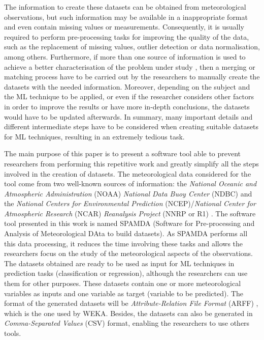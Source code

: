 \documentclass[energies,article,submit,moreauthors,pdftex]{Definitions/mdpi}
\begin{document}
		The information to create these datasets can be obtained from meteorological observations, but such information may be available in a inappropriate format and even contain missing values or measurements. Consequently, it is usually required to perform pre-processing tasks for improving the quality of the data, such as the replacement of missing values, outlier detection or data normalisation, among others. Furthermore, if more than one source of information is used to achieve a better characterisation of the problem under study \cite{FERNANDEZ201544, Adams2010}, then a merging or matching process have to be carried out by the researchers to manually create the datasets with the needed information. Moreover, depending on the subject and the ML technique to be applied, or even if the researcher considers other factors in order to improve the results or have more in-depth conclusions, the datasets would have to be updated afterwards. In summary, many important details and different intermediate steps have to be considered when creating suitable datasets for ML techniques, resulting in an extremely tedious task.

		The main purpose of this paper is to present a software tool able to prevent researchers from performing this repetitive work and greatly simplify all the steps involved in the creation of datasets. The meteorological data considered for the tool come from two well-known sources of information: the \textit{National Oceanic and Atmospheric Administration} (NOAA) \textit{National Data Buoy Center} (NDBC) \cite{NOAA} and the \textit{National Centers for Environmental Prediction} (NCEP)/\textit{National Center for Atmospheric Research} (NCAR) \textit{Reanalysis Project} (NNRP or R1) \cite{Kalnay1996, Kistler2001}. The software tool presented in this work is named SPAMDA (Software for Pre-processing and Analysis of Meteorological DAta to build datasets). As SPAMDA performs all this data processing, it reduces the time involving these tasks and allows the researchers focus on the study of the meteorological aspects of the observations. The datasets obtained are ready to be used as input for ML techniques in prediction tasks (classification or regression), although the researchers can use them for other purposes. These datasets contain one or more meteorological variables as inputs and one variable as target (variable to be predicted). The format of the generated datasets will be \textit{Attribute-Relation File Format} (ARFF) \cite{WEKA_ARFF}, which is the one used by WEKA. Besides, the datasets can also be generated in \textit{Comma-Separated Values} (CSV) format, enabling the researchers to use others tools.
		
\end{document}
